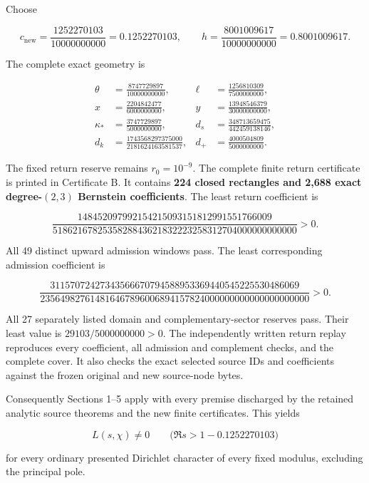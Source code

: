 Choose

\[
 \boxed{c_{\mathrm{new}}=\frac{1252270103}{10000000000}
                       =0.1252270103},\qquad
 h=\frac{8001009617}{10000000000}=0.8001009617.
\tag{NR11}
\]

The complete exact geometry is

\[
\begin{aligned}
 \theta&=\frac{8747729897}{10000000000},&
 \ell&=\frac{1256810309}{7500000000},\\
 x&=\frac{2204842477}{6000000000},&
 y&=\frac{13948546379}{30000000000},\\
 \kappa_*&=\frac{3747729897}{5000000000},&
 d_s&=\frac{348713659475}{442459138146},\\
 d_k&=\frac{1743568297375000}{2181624163581537},&
 d_+&=\frac{4000504809}{5000000000}.
\end{aligned}
\tag{NR12}
\]

The fixed return reserve remains \(r_0=10^{-9}\). The complete finite return certificate is printed in Certificate B. It contains \textbf{224 closed rectangles and 2,688 exact degree-\((2,3)\) Bernstein coefficients}. The least return coefficient is

\[
 \frac{148452097992154215093151812991551766009}
 {5186216782535828843621832223258312704000000000000}>0.
\tag{NR13}
\]

All 49 distinct upward admission windows pass. The least corresponding admission coefficient is

\[
 \frac{31157072427343566670794588953369440545225530486069}
 {235649827614816467896006894157824000000000000000000000}>0.
\tag{NR14}
\]

All 27 separately listed domain and complementary-sector reserves pass. Their least value is \(29103/5000000000>0\). The independently written return replay reproduces every coefficient, all admission and complement checks, and the complete cover. It also checks the exact selected source IDs and coefficients against the frozen original and new source-node bytes.

Consequently Sections 1--5 apply with every premise discharged by the retained analytic source theorems and the new finite certificates. This yields

\[
 \boxed{L(s,\chi)\ne0\qquad
        \bigl(\Re s>1-0.1252270103\bigr)}
\tag{NR15}
\]

for every ordinary presented Dirichlet character of every fixed modulus, excluding the principal pole.
